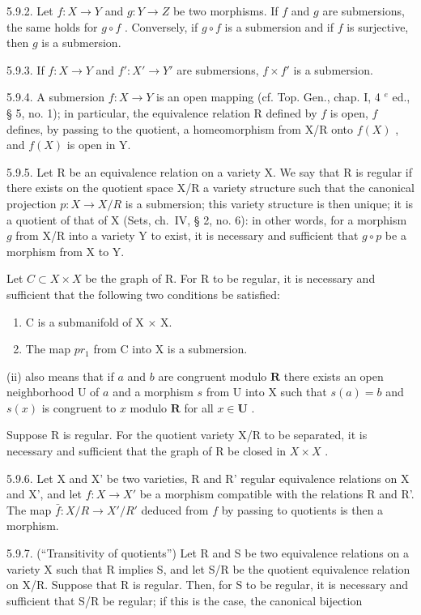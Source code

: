 5.9.2. Let \(f: X \to Y\) and \(g: Y \to Z\) be two morphisms. If \(f\) and \(g\) are submersions, the same holds for \(g \circ f\) . Conversely, if \(g \circ f\) is a submersion and if \(f\) is surjective, then \(g\) is a submersion.

5.9.3. If \(f: X \to Y\) and \(f': X' \to Y'\) are submersions, \(f \times f'\) is a submersion.

5.9.4. A submersion \(f: X \to Y\) is an open mapping (cf. Top. Gen., chap. I, 4 \(^{e}\) ed., § 5, no. 1); in particular, the equivalence relation R defined by \(f\) is open, \(f\) defines, by passing to the quotient, a homeomorphism from X/R onto \(f(X)\) , and \(f(X)\) is open in Y.

5.9.5. Let R be an equivalence relation on a variety X. We say that R is regular if there exists on the quotient space X/R a variety structure such that the canonical projection \(p: X \to X/R\) is a submersion; this variety structure is then unique; it is a quotient of that of X (Sets, ch.~IV, § 2, no. 6): in other words, for a morphism \(g\) from X/R into a variety Y to exist, it is necessary and sufficient that \(g \circ p\) be a morphism from X to Y.

Let \(C \subset X \times X\) be the graph of R. For R to be regular, it is necessary and sufficient that the following two conditions be satisfied:

\begin{enumerate}
\def\labelenumi{(\roman{enumi})}
\item
  C is a submanifold of X × X.
\item
  The map \(pr_{1}\) from C into X is a submersion.
\end{enumerate}

(ii) also means that if \(a\) and \(b\) are congruent modulo \(\mathbf{R}\) there exists an open neighborhood U of \(a\) and a morphism \(s\) from U into X such that \(s(a) = b\) and \(s(x)\) is congruent to \(x\) modulo \(\mathbf{R}\) for all \(x \in \mathbf{U}\) .

Suppose R is regular. For the quotient variety X/R to be separated, it is necessary and sufficient that the graph of R be closed in \(X \times X\) .

5.9.6. Let X and X' be two varieties, R and R' regular equivalence relations on X and X', and let \(f: X \to X'\) be a morphism compatible with the relations R and R'. The map \(\bar{f}: X/R \to X'/R'\) deduced from \(f\) by passing to quotients is then a morphism.

5.9.7. (“Transitivity of quotients”) Let R and S be two equivalence relations on a variety X such that R implies S, and let S/R be the quotient equivalence relation on X/R. Suppose that R is regular. Then, for S to be regular, it is necessary and sufficient that S/R be regular; if this is the case, the canonical bijection

